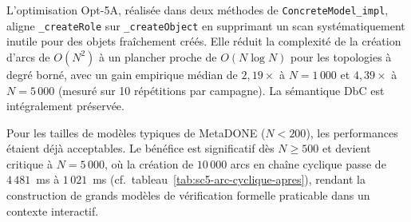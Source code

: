 L'optimisation Opt-5A, réalisée dans deux méthodes de \texttt{ConcreteModel\_impl}, aligne \texttt{\_createRole} sur \texttt{\_createObject} en supprimant un scan systématiquement inutile pour des objets fraîchement créés. Elle réduit la complexité de la création d'arcs de $O(N^2)$ à un plancher proche de $O(N \log N)$ pour les topologies à degré borné, avec un gain empirique médian de $2{,}19\times$ à $N = 1\,000$ et $4{,}39\times$ à $N = 5\,000$ (mesuré sur 10 répétitions par campagne). La sémantique DbC est intégralement préservée.

Pour les tailles de modèles typiques de MetaDONE ($N < 200$), les performances étaient déjà acceptables. Le bénéfice est significatif dès $N \geq 500$ et devient critique à $N = 5\,000$, où la création de $10\,000$ arcs en chaîne cyclique passe de $4\,481$~ms à $1\,021$~ms (cf.~tableau~\ref{tab:sc5-arc-cyclique-apres}), rendant la construction de grands modèles de vérification formelle praticable dans un contexte interactif.
